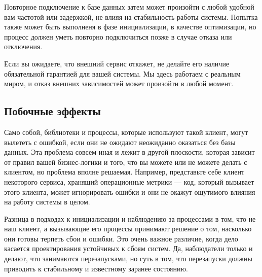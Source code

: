 Повторное подключение к базе данных затем может произойти с любой удобной вам частотой или задержкой, не влияя на стабильность работы системы. Попытка также может быть выполненя в фазе инициализации, в качестве оптимизации, но процесс должен уметь повторно подключиться позже в случае отказа или отключения.

Если вы ожидаете, что внешний сервис откажет, не делайте его наличие обязательной гарантией для вашей системы. Мы здесь работаем с реальным миром, и отказ внешних зависимостей может произойти в любой момент.


\subsection{Побочные эффекты}
\label{subsec:start-link-side-effects}

Само собой, библиотеки и процессы, которые используют такой клиент, могут вылететь с ошибкой, если они не ожидают неожиданно оказаться без базы данных. Эта проблема совсем иная и лежит в другой плоскости, которая зависит от правил вашей бизнес-логики и того, что вы можете или не можете делать с клиентом, но проблема вполне решаемая. Например, представьте себе клиент некоторого сервиса, хранящий операционные метрики --- код, который вызывает этого клиента, может игнорировать ошибки и они не окажут ощутимого влияния на работу системы в целом.

Разница в подходах к инициализации и наблюдению за процессами в том, что не наш клиент, а вызывающие его процессы принимают решение о том, насколько они готовы терпеть сбои и ошибки. Это очень важное различие, когда дело касается проектирования устойчивых к сбоям систем. Да, наблюдатели только и делают, что занимаются перезапусками, но суть в том, что перезапуски должны приводить к стабильному и известному заранее состоянию.


